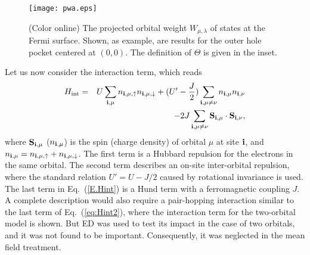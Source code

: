 \documentclass[aps,prb,superscriptaddress,preprintnumbers,
showpacs,legalpaper,twoside,twocolumn,amsmath,amssymb]{revtex4}
\begin{document}
\begin{figure}[h]
\vskip -0.3cm
\centerline{\texttt{[image: pwa.eps]}}
\vskip -0.5cm
%
\caption{(Color online) The projected orbital weight
$W_{\mu,\lambda}$ of states at the Fermi surface. Shown, as example, are results for the
outer hole pocket
centered at $(0,0)$.
The
definition of $\Theta$ is given in the inset.
}
\vskip -0.3cm
\label{F.Project}
\end{figure}



Let us now consider the interaction term,\cite{daghofer} which reads
%
\begin{eqnarray}\label{E.Hint}
H_{\rm int} &=& U\sum_{{\bf i},\mu}n_{{\bf i},\mu,\uparrow}n_{{\bf i},\mu,\downarrow}
+(U'-{J\over{2}})\sum_{{\bf i},\mu\neq\nu} n_{{\bf i},\mu}n_{{\bf i},\nu}
\nonumber \\
& & -2J\sum_{{\bf i},\mu\neq\nu}\mathbf{S}_{{\bf i},\mu}\cdot\mathbf{S}_{{\bf i},\nu},
\end{eqnarray}
where $\mathbf{S}_{{\bf i},\mu}$ ($n_{{\bf i},\mu}$) is the spin (charge
density) of orbital $\mu$ at site ${\bf i}$, and
$n_{{\bf i},\mu}=n_{{\bf i},\mu,\uparrow}+n_{{\bf i},\mu,\downarrow}$. The first term
is a Hubbard repulsion for the electrons in the same orbital. The
second term describes an on-site inter-orbital repulsion, where the
standard relation $U'=U-J/2$ caused by rotational invariance is used.\cite{RMP01} The last term in
Eq.~(\ref{E.Hint}) is a Hund term with a ferromagnetic coupling $J$.
A complete description would also require a
pair-hopping interaction similar to the last term of
Eq.~(\ref{eq:Hint2}), where the interaction term for the
two-orbital model is shown. But
ED was used to test its impact in the case of two orbitals,
and it was not found to be important. Consequently, it was neglected in the
mean field treatment.
\end{document}
